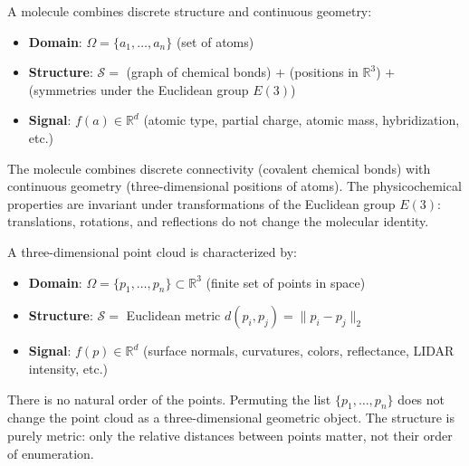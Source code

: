 \begin{example}\label{ex:molecula}
A molecule combines discrete structure and continuous geometry:
\begin{itemize}
	\item \textbf{Domain}: $\Omega = \{a_1, \ldots, a_n\}$ (set of atoms)
	\item \textbf{Structure}: $\mathcal{S} = $ (graph of chemical bonds) $+$ (positions in $\mathbb{R}^3$) $+$ (symmetries under the Euclidean group $E(3)$)
	\item \textbf{Signal}: $f(a) \in \mathbb{R}^d$ (atomic type, partial charge, atomic mass, hybridization, etc.)
\end{itemize}

The molecule combines discrete connectivity (covalent chemical bonds) with continuous geometry (three-dimensional positions of atoms). The physicochemical properties are invariant under transformations of the Euclidean group $E(3)$: translations, rotations, and reflections do not change the molecular identity.
\end{example}

\begin{example}\label{ex:nube_puntos}
A three-dimensional point cloud is characterized by:
\begin{itemize}
	\item \textbf{Domain}: $\Omega = \{p_1, \ldots, p_n\} \subset \mathbb{R}^3$ (finite set of points in space)
	\item \textbf{Structure}: $\mathcal{S} = $ Euclidean metric $d(p_i, p_j) = \|p_i - p_j\|_2$
	\item \textbf{Signal}: $f(p) \in \mathbb{R}^d$ (surface normals, curvatures, colors, reflectance, LIDAR intensity, etc.)
\end{itemize}

There is no natural order of the points. Permuting the list $\{p_1,\ldots,p_n\}$ does not change the point cloud as a three-dimensional geometric object. The structure is purely metric: only the relative distances between points matter, not their order of enumeration.
\end{example}

